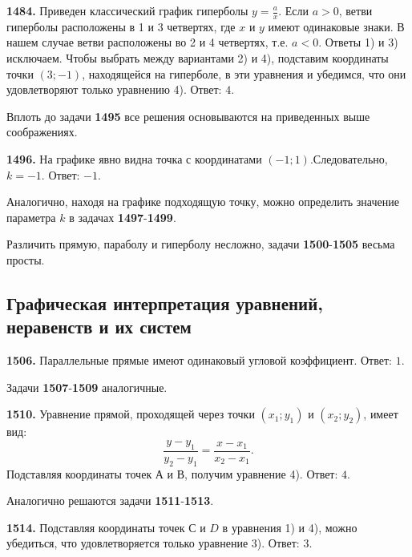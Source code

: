 \textbf{1484.} Приведен классический график гиперболы $y=\frac{a}{x}$. Если $a>0$, ветви гиперболы расположены в 1 и 3 четвертях, где $x$ и $y$ имеют одинаковые знаки. В нашем случае ветви расположены во 2 и 4 четвертях, т.е. $a<0$. Ответы 1) и 3) исключаем. Чтобы выбрать между вариантами 2) и 4), подставим координаты точки $(3;-1)$, находящейся на гиперболе,  в эти уравнения и убедимся, что они удовлетворяют только уравнению 4). \newline \null \hspace*{\fill} Ответ: $4$.

Вплоть до задачи \textbf{1495} все решения основываются на приведенных выше соображениях.

\textbf{1496.} На графике явно видна точка с координатами $(-1;1)$.\newline Следовательно, $k=-1$. \newline \null \hspace*{\fill} Ответ: $-1$. 

Аналогично, находя на графике подходящую точку, можно определить значение параметра $k$ в задачах \textbf{1497}-\textbf{1499}.

Различить прямую, параболу и гиперболу несложно, задачи \newline\textbf{1500}-\textbf{1505} весьма просты.

\subsection{Графическая интерпретация уравнений, неравенств и их систем}


\textbf{1506.}  Параллельные прямые имеют одинаковый угловой коэффициент. \newline \null \hspace*{\fill} Ответ: $1$. 

Задачи  \textbf{1507}-\textbf{1509} аналогичные.

\newpage \textbf{1510.} Уравнение прямой, проходящей через точки $(x_1;y_1)$ и \newline $(x_2;y_2)$, имеет вид: $$\frac{y-y_1}{y_2-y_1}=\frac{x-x_1}{x_2-x_1}.$$
Подставляя координаты точек  А и В, получим уравнение 4). \newline \null \hspace*{\fill} Ответ: $4$. 

Аналогично решаются задачи \textbf{1511}-\textbf{1513}.

\textbf{1514.} Подставляя координаты точек $С$ и $D$ в уравнения 1) и 4), можно убедиться, что  удовлетворяется только уравнение 3). \newline \null \hspace*{\fill} Ответ: $3$.

